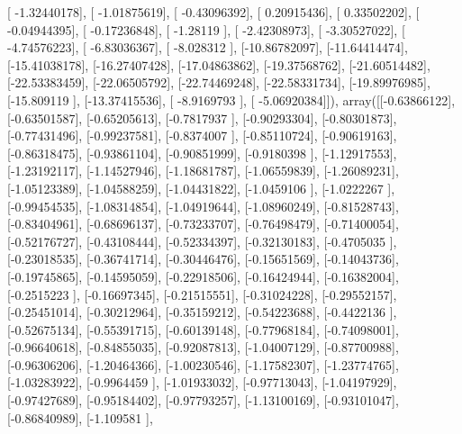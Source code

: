 \documentclass{article}
\begin{document}
       [ -1.32440178],
       [ -1.01875619],
       [ -0.43096392],
       [  0.20915436],
       [  0.33502202],
       [ -0.04944395],
       [ -0.17236848],
       [ -1.28119   ],
       [ -2.42308973],
       [ -3.30527022],
       [ -4.74576223],
       [ -6.83036367],
       [ -8.028312  ],
       [-10.86782097],
       [-11.64414474],
       [-15.41038178],
       [-16.27407428],
       [-17.04863862],
       [-19.37568762],
       [-21.60514482],
       [-22.53383459],
       [-22.06505792],
       [-22.74469248],
       [-22.58331734],
       [-19.89976985],
       [-15.809119  ],
       [-13.37415536],
       [ -8.9169793 ],
       [ -5.06920384]]), array([[-0.63866122],
       [-0.63501587],
       [-0.65205613],
       [-0.7817937 ],
       [-0.90293304],
       [-0.80301873],
       [-0.77431496],
       [-0.99237581],
       [-0.8374007 ],
       [-0.85110724],
       [-0.90619163],
       [-0.86318475],
       [-0.93861104],
       [-0.90851999],
       [-0.9180398 ],
       [-1.12917553],
       [-1.23192117],
       [-1.14527946],
       [-1.18681787],
       [-1.06559839],
       [-1.26089231],
       [-1.05123389],
       [-1.04588259],
       [-1.04431822],
       [-1.0459106 ],
       [-1.0222267 ],
       [-0.99454535],
       [-1.08314854],
       [-1.04919644],
       [-1.08960249],
       [-0.81528743],
       [-0.83404961],
       [-0.68696137],
       [-0.73233707],
       [-0.76498479],
       [-0.71400054],
       [-0.52176727],
       [-0.43108444],
       [-0.52334397],
       [-0.32130183],
       [-0.4705035 ],
       [-0.23018535],
       [-0.36741714],
       [-0.30446476],
       [-0.15651569],
       [-0.14043736],
       [-0.19745865],
       [-0.14595059],
       [-0.22918506],
       [-0.16424944],
       [-0.16382004],
       [-0.2515223 ],
       [-0.16697345],
       [-0.21515551],
       [-0.31024228],
       [-0.29552157],
       [-0.25451014],
       [-0.30212964],
       [-0.35159212],
       [-0.54223688],
       [-0.4422136 ],
       [-0.52675134],
       [-0.55391715],
       [-0.60139148],
       [-0.77968184],
       [-0.74098001],
       [-0.96640618],
       [-0.84855035],
       [-0.92087813],
       [-1.04007129],
       [-0.87700988],
       [-0.96306206],
       [-1.20464366],
       [-1.00230546],
       [-1.17582307],
       [-1.23774765],
       [-1.03283922],
       [-0.9964459 ],
       [-1.01933032],
       [-0.97713043],
       [-1.04197929],
       [-0.97427689],
       [-0.95184402],
       [-0.97793257],
       [-1.13100169],
       [-0.93101047],
       [-0.86840989],
       [-1.109581  ],
\end{document}
